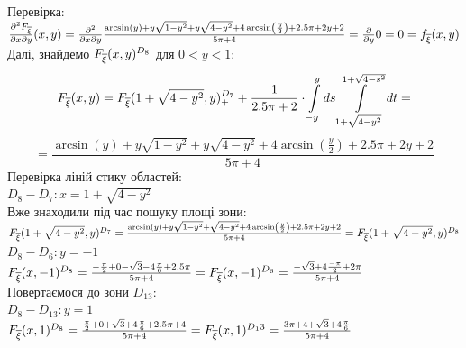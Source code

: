 \documentclass[14pt,a4paper]{scrartcl}
\theoremstyle{definition}
\theoremstyle{remark}
\theoremstyle{definition}
\theoremstyle{definition}
\begin{document}
Перевірка:\\
$\frac{\partial^2 F_{\overline{\xi}}}{\partial x \partial y}(x,y) =
\frac{\partial^2}{\partial x \partial y} \frac{\arcsin\left(y\right)+y\sqrt{1-y^2}+  y  \sqrt{4-y^2}+4\arcsin\left(\frac{y}{2}\right) + 2.5\pi + 2y + 2}{5\pi + 4}  = \frac{\partial}{\partial y}0 = 0=f_{\overline{\xi}} (x,y)$\\
Далі, знайдемо $F_{\overline{\xi}}(x,y)^{D_8}$ для $ 0< y < 1$:
$$
F_{\overline{\xi}} (x,y) =  F_{\overline{\xi}} (1+\sqrt{4 - y^2}, y)^{D_7}_{+} + \frac{1}{2.5\pi + 2} \cdot  \int\limits_{-y}^{ y}{ds  \int\limits_{1 + \sqrt{4 - y^2}}^{1 + \sqrt{4 -  s^2}}{dt}} =
$$
$$
= \dfrac{\arcsin\left(y\right)+y\sqrt{1-y^2} +  y \sqrt{4-y^2}+4\arcsin\left(\frac{  y }{2}\right) + 2.5\pi + 2y + 2}{5\pi + 4}
$$
Перевірка ліній стику областей:\\
$D_8 - D_7: x = 1 + \sqrt{4 - y^2}$\\
Вже знаходили під час пошуку площі зони:\\
$ F_{\overline{\xi}} (1 + \sqrt{4 - y^2},y)^{D_7} =  \frac{\arcsin\left(y\right)+y\sqrt{1-y^2}+ \sqrt{4-y^2}+4\arcsin\left(\frac{y}{2}\right) + 2.5\pi + 2y + 2}{5\pi + 4} = F_{\overline{\xi}} (1 + \sqrt{4 - y^2},y)^{D_8}$\\
$D_8 - D_6: y = -1$\\
$ F_{\overline{\xi}} (x,-1)^{D_8} = \frac{- \frac{\pi}{2} +0-\sqrt{3}-4\frac{\pi}{6}  + 2.5\pi}{5\pi + 4}
 = F_{\overline{\xi}} (x,-1)^{D_6}  =  \frac{-\sqrt{3} + 4\frac{-\pi}{2}  + 2\pi }{5\pi +4}$\\
 Повертаємося до зони $D_13:$\\
 $D_8 - D_{13}: y = 1$\\
$
F_{\overline{\xi}} (x, 1)^{D_8} = \frac{ \frac{\pi}{2} + 0 + \sqrt{3} + 4\frac{\pi }{6} + 2.5\pi + 4  }{5\pi + 4}   = F_{\overline{\xi}} (x, 1)^{D_13} = \frac{3\pi + 4 + \sqrt{3} + 4\frac{\pi}{6} }{ 5\pi + 4}
$

\newpage
\end{document}
